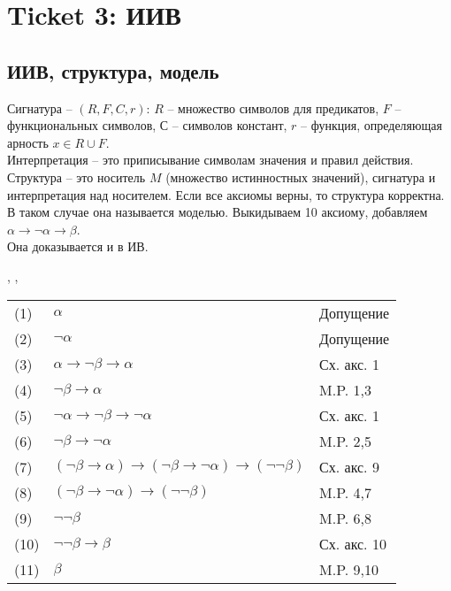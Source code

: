 \section{Ticket 3: ИИВ}
\label{sec-5}
\subsection{ИИВ, структура, модель}
\label{sec-5-1}
Сигнатура -- $(R, F, C, r)$: $R$ -- множество символов для предикатов, $F$ -- функциональных символов, $С$ -- символов констант, $r$ -- функция, определяющая арность $x \in R \cup F$. \\ 
Интерпретация -- это приписывание символам значения и правил действия. \\
Структура -- это носитель $M$ (множество истинностных значений), сигнатура и интерпретация над носителем.
Если все аксиомы верны, то структура корректна.
В таком случае она называется моделью.
Выкидываем 10 аксиому, добавляем $\alpha \rightarrow \neg \alpha \rightarrow \beta$.\\

Она доказывается и в ИВ.
\begin{lemma} 
\alpha, \alpha \vee \neg \alpha, \neg \alpha \vdash \beta\
\end{lemma}
\begin{tabular}{lll}
(1) & $\alpha$& Допущение\\
(2) & $\neg \alpha$& Допущение\\
(3) & $\alpha \rightarrow \neg \beta \rightarrow \alpha$& Сх. акс. 1\\
(4) & $\neg \beta \rightarrow \alpha$& M.P. 1,3\\
(5) & $\neg \alpha \rightarrow \neg \beta \rightarrow \neg \alpha$& Сх. акс. 1\\
(6) & $\neg \beta \rightarrow \neg \alpha$& M.P. 2,5\\
(7) & $(\neg \beta \rightarrow \alpha) \rightarrow (\neg \beta \rightarrow \neg \alpha) \rightarrow (\neg \neg \beta)$& Сх. акс. 9\\
(8) & $(\neg \beta \rightarrow \neg \alpha) \rightarrow (\neg \neg \beta)$& M.P. 4,7\\
(9) & $\neg \neg \beta$& M.P. 6,8\\
(10) & $\neg \neg \beta \rightarrow \beta$& Сх. акс. 10\\
(11) & $\beta$& M.P. 9,10\\
\end{tabular}


